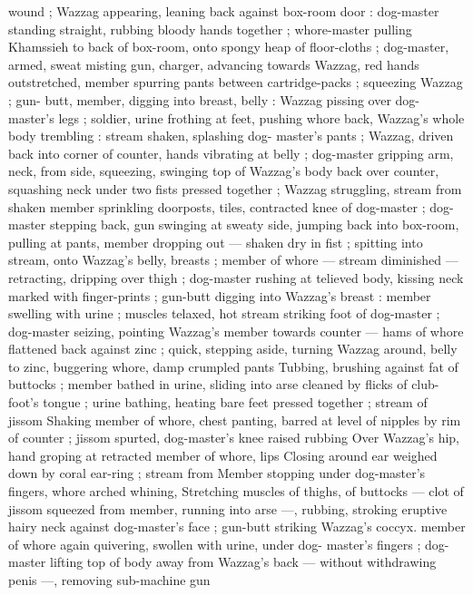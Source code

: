 wound ; Wazzag appearing, leaning back against box-room door : 
dog-master standing straight, rubbing bloody hands together ; 
whore-master pulling Khamssieh to back of box-room, onto spongy 
heap of floor-cloths ; dog-master, armed, sweat misting gun, charger, 
advancing towards Wazzag, red hands outstretched, member 
spurring pants between cartridge-packs ; squeezing Wazzag ; gun- 
butt, member, digging into breast, belly : Wazzag pissing over dog- 
master's legs ; soldier, urine frothing at feet, pushing whore back, 
Wazzag's whole body trembling : stream shaken, splashing dog- 
master's pants ; Wazzag, driven back into corner of counter, hands 
vibrating at belly ; dog-master gripping arm, neck, from side, 
squeezing, swinging top of Wazzag's body back over counter, 
squashing neck under two fists pressed together ; Wazzag 
struggling, stream from shaken member sprinkling doorposts, tiles, 
contracted knee of dog-master ; dog-master stepping back, gun 
swinging at sweaty side, jumping back into box-room, pulling at 
pants, member dropping out --- shaken dry in fist ; spitting into 
stream, onto Wazzag's belly, breasts ; member of whore --- stream 
diminished --- retracting, dripping over thigh ; dog-master rushing at 
telieved body, kissing neck marked with finger-prints ; gun-butt 
digging into Wazzag's breast : member swelling with urine ; muscles 
telaxed, hot stream striking foot of dog-master ; dog-master seizing, 
pointing Wazzag's member towards counter --- hams of whore 
flattened back against zinc ; quick, stepping aside, turning Wazzag 
around, belly to zinc, buggering whore, damp crumpled pants 
Tubbing, brushing against fat of buttocks ; member bathed in urine, 
sliding into arse cleaned by flicks of club-foot's tongue ; urine 
bathing, heating bare feet pressed together ; stream of jissom 
Shaking member of whore, chest panting, barred at level of nipples 
by rim of counter ; jissom spurted, dog-master's knee raised rubbing 
Over Wazzag's hip, hand groping at retracted member of whore, lips 
Closing around ear weighed down by coral ear-ring ; stream from 
Member stopping under dog-master's fingers, whore arched whining, 
Stretching muscles of thighs, of buttocks --- clot of jissom squeezed 
from member, running into arse ---, rubbing, stroking eruptive hairy 
neck against dog-master's face ; gun-butt striking Wazzag's coccyx. 
member of whore again quivering, swollen with urine, under dog- 
master's fingers ; dog-master lifting top of body away from Wazzag's 
back --- without withdrawing penis ---, removing sub-machine gun 
